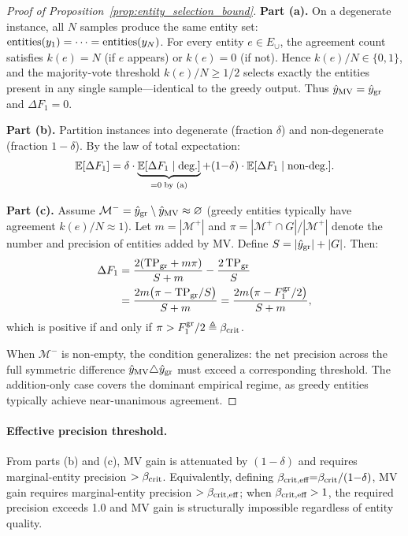 \begin{proof}[Proof of Proposition~\ref{prop:entity_selection_bound}]
\textbf{Part (a).} On a degenerate instance, all $N$ samples produce the same entity set: $\textup{entities}(y_1) = \cdots = \textup{entities}(y_N)$. For every entity $e \in E_\cup$, the agreement count satisfies $k(e) = N$ (if $e$ appears) or $k(e) = 0$ (if not). Hence $k(e)/N \in \{0,1\}$, and the majority-vote threshold $k(e)/N \geq 1/2$ selects exactly the entities present in any single sample---identical to the greedy output. Thus $\hat{y}_{\textup{MV}} = \hat{y}_{\textup{gr}}$ and $\Delta F_1 = 0$.

\textbf{Part (b).} Partition instances into degenerate (fraction $\delta$) and non-degenerate (fraction $1{-}\delta$). By the law of total expectation:
\[
\mathbb{E}[\Delta F_1] = \delta \cdot \underbrace{\mathbb{E}[\Delta F_1 \mid \textup{deg.}]}_{= 0 \;\textup{by (a)}} + (1{-}\delta) \cdot \mathbb{E}[\Delta F_1 \mid \textup{non-deg.}].
\]

\textbf{Part (c).} Assume $\mathcal{M}^- = \hat{y}_{\textup{gr}} \setminus \hat{y}_{\textup{MV}} \approx \varnothing$ (greedy entities typically have agreement $k(e)/N \approx 1$). Let $m = |\mathcal{M}^+|$ and $\pi = |\mathcal{M}^+ \cap G|/|\mathcal{M}^+|$ denote the number and precision of entities added by MV. Define $S = |\hat{y}_{\textup{gr}}| + |G|$. Then:
\begin{align*}
\Delta F_1 &= \frac{2(\textup{TP}_{\textup{gr}} + m\pi)}{S + m} - \frac{2\,\textup{TP}_{\textup{gr}}}{S} \\
&= \frac{2m\bigl(\pi - \textup{TP}_{\textup{gr}}/S\bigr)}{S + m}
= \frac{2m\bigl(\pi - F_1^{\textup{gr}}/2\bigr)}{S + m},
\end{align*}
which is positive if and only if $\pi > F_1^{\textup{gr}}/2 \triangleq \beta_{\textup{crit}}$.

When $\mathcal{M}^-$ is non-empty, the condition generalizes: the net precision across the full symmetric difference $\hat{y}_{\textup{MV}} \triangle \hat{y}_{\textup{gr}}$ must exceed a corresponding threshold. The addition-only case covers the dominant empirical regime, as greedy entities typically achieve near-unanimous agreement.
\end{proof}

\paragraph{Effective precision threshold.}
From parts (b) and (c), MV gain is attenuated by $(1{-}\delta)$ and requires marginal-entity precision $> \beta_{\textup{crit}}$.
Equivalently, defining $\beta_{\textup{crit,eff}} {=} \beta_{\textup{crit}} / (1{-}\delta)$, MV gain requires marginal-entity precision $> \beta_{\textup{crit,eff}}$; when $\beta_{\textup{crit,eff}} > 1$, the required precision exceeds 1.0 and MV gain is structurally impossible regardless of entity quality.

